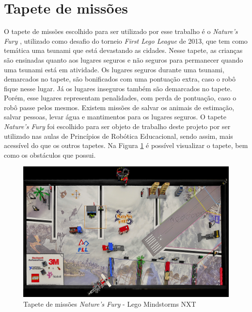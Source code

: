 \section{Tapete de missões} \label{tapeteDeMissoes}
O tapete de missões escolhido para ser utilizado por esse trabalho é o \textit{Nature's Fury} \cite{challengeFury}, utilizado como desafio do torneio \textit{First Lego League} de 2013, que tem como temática uma tsunami que está devastando as cidades. Nesse tapete, as crianças são ensinadas quanto aos lugares seguros e não seguros para permanecer quando uma tsunami está em atividade. Os lugares seguros durante uma tsunami, demarcados no tapete, são bonificados com uma pontuação extra, caso o robô fique nesse lugar. Já os lugares inseguros também são demarcados no tapete. Porém, esse lugares representam penalidades, com perda de pontuação, caso o robô passe pelos mesmos. Existem missões de salvar os animais de estimação, salvar pessoas, levar água e mantimentos para os lugares seguros.
O tapete \textit{Nature's Fury} foi escolhido para ser objeto de trabalho deste projeto por ser utilizado nas aulas de Princípios de Robótica Educacional, sendo assim, mais acessível do que os outros tapetes. Na Figura \ref{natureFury} é possível visualizar o tapete, bem como os obstáculos que possui. 

\FloatBarrier
\begin{figure}[!h]
\centering
\includegraphics[keepaspectratio=true,scale=0.5]{figuras/natureFury.png}
\caption{Tapete de missões \textit{Nature's Fury} - Lego Mindstorms NXT}
\label{natureFury}
\end{figure}

 

